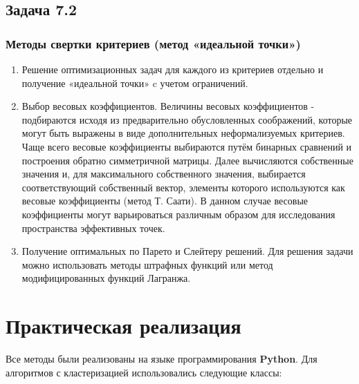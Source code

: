\documentclass[a4paper, 12pt]{article}   	%
\begin{document}
    



\subsection{Задача 7.2}

    \subsubsection{Методы свертки критериев (метод «идеальной точки»)}
    \begin{enumerate}
    	\item Решение оптимизационных задач для каждого из критериев отдельно и получение «идеальной точки» c учетом ограничений.
    	\item Выбор весовых коэффициентов. Величины весовых коэффициентов  - подбираются исходя из предварительно обусловленных соображений, которые могут быть выражены в виде дополнительных неформализуемых критериев. Чаще всего весовые коэффициенты выбираются путём бинарных сравнений и построения обратно симметричной матрицы. Далее вычисляются  собственные значения и, для максимального собственного значения, выбирается соответствующий собственный вектор, элементы которого используются как весовые коэффициенты (метод Т. Саати). В данном случае весовые коэффициенты могут варьироваться различным образом для исследования пространства эффективных точек.
    	\item Получение оптимальных по Парето и Слейтеру решений. Для решения задачи можно использовать методы штрафных функций или метод модифицированных функций Лагранжа.
     \end{enumerate}

    
\newpage

\section{Практическая реализация}

    Все методы были реализованы на языке программирования \textbf{Python}. Для алгоритмов с кластеризацией использовались следующие классы:
    
\end{document}
